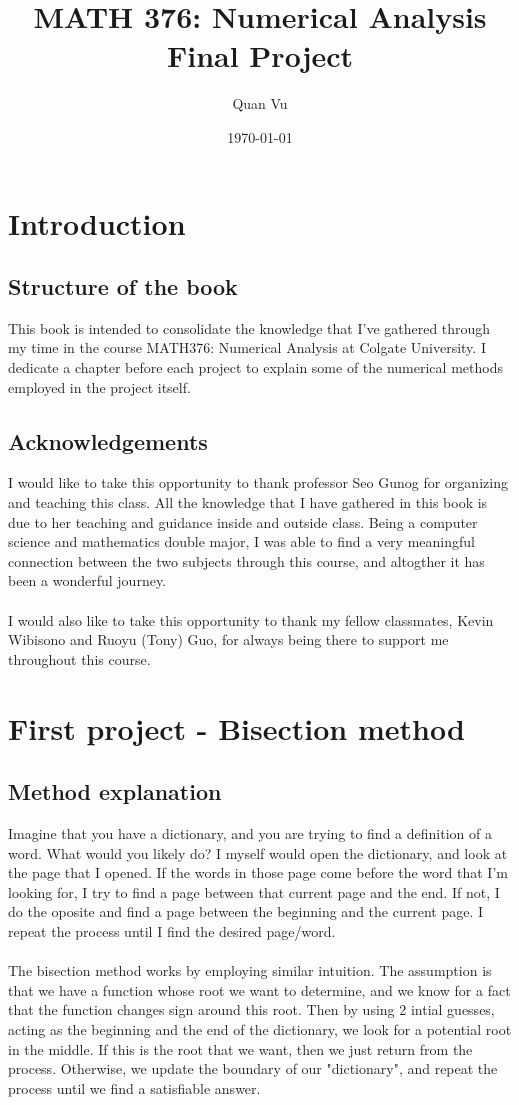 \documentclass{book}
\title{%
	MATH 376: Numerical Analysis \\
	\large  Final Project
	}
\author{Quan Vu}
\date{\today}
\begin{document}
	\maketitle
	\chapter{Introduction}
	\section{Structure of the book}
	This book is intended to consolidate the knowledge that I've gathered through my time in the course MATH376: Numerical Analysis at Colgate University. I dedicate a chapter before each project to explain some of the numerical methods employed in the project itself.
	\section{Acknowledgements}
	I would like to take this opportunity to thank professor Seo Gunog for organizing and teaching this class. All the knowledge that I have gathered in this book is due to her teaching and guidance inside and outside class. Being a computer science and mathematics double major, I was able to find a very meaningful connection between the two subjects through this course, and altogther it has been a wonderful journey.\\\\
	I would also like to take this opportunity to thank my fellow classmates, Kevin Wibisono and Ruoyu (Tony) Guo, for always being there to support me throughout this course.  
	\chapter{First project - Bisection method}
	\section{Method explanation}
	Imagine that you have a dictionary, and you are trying to find a definition of a word. What would you likely do? I myself would open the dictionary, and look at the page that I opened. If the words in those page come before the word that I'm looking for, I try to find a page between that current page and the end. If not, I do the oposite and find a page between the beginning and the current page. I repeat the process until I find the desired page/word.\\\\
	The bisection method works by employing similar intuition. The assumption is that we have a function whose root we want to determine, and we know for a fact that the function changes sign around this root. Then by using 2 intial guesses, acting as the beginning and the end of the dictionary, we look for a potential root in the middle. If this is the root that we want, then we just return from the process. Otherwise, we update the boundary of our "dictionary", and repeat the process until we find a satisfiable answer.
\end{document}
